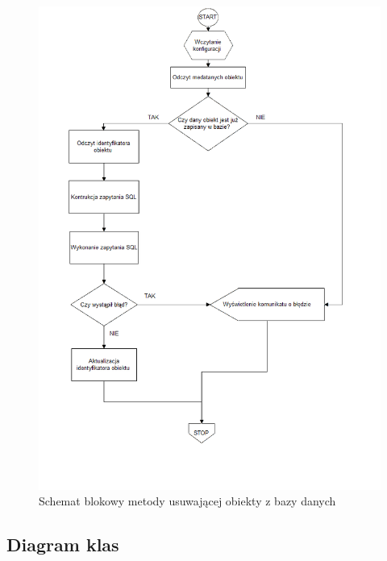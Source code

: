 \documentclass[12pt]{report}
\begin{document}
\begin{figure}[H]
\centering
\includegraphics[width=\textwidth]{resources/remove_schema.png}
\caption{Schemat blokowy metody usuwającej obiekty z bazy danych}
\end{figure}

\subsection{Diagram klas}
\end{document}
